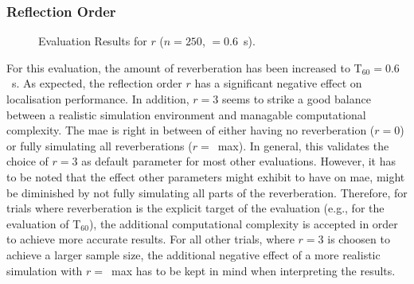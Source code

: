 \subsubsection*{Reflection Order}
\begin{figure}[H]
\iftoggle{quick}{
    \texttt{[image: plots/boxplots/boxplot-joined-reflect-order]}
}{%
    
}
	\caption[Evaluation Results for $r$]{Evaluation Results for $r$ ($n=250$, \Tsixty$=0.6$~s).}
	\label{fig:trialR}
\end{figure}

For this evaluation, the amount of reverberation has been increased to T$_{60}=0.6$~s. As expected, the reflection order $r$ has a significant negative effect on localisation performance. In addition, $r=3$ seems to strike a good balance between a realistic simulation environment and managable computational complexity. The \gls{mae} is right in between of either having no reverberation ($r=0$) or fully simulating all reverberations ($r=$~max). In general, this validates the choice of $r=3$ as default parameter for most other evaluations. However, it has to be noted that the effect other parameters might exhibit to have on \gls{mae}, might be diminished by not fully simulating all parts of the reverberation. Therefore, for trials where reverberation is the explicit target of the evaluation (e.g., for the evaluation of T$_{60}$), the additional computational complexity is accepted in order to achieve more accurate results. For all other trials, where $r=3$ is choosen to achieve a larger sample size, the additional negative effect of a more realistic simulation with $r=$~max has to be kept in mind when interpreting the results.

